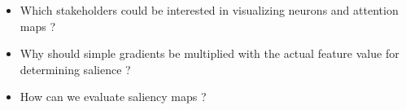 \begin{itemize}
\item Which stakeholders could be interested in visualizing neurons and attention maps ?
\item Why should simple gradients be multiplied with the actual feature value for determining salience ?
\item How can we evaluate saliency maps  ?
\end{itemize}
